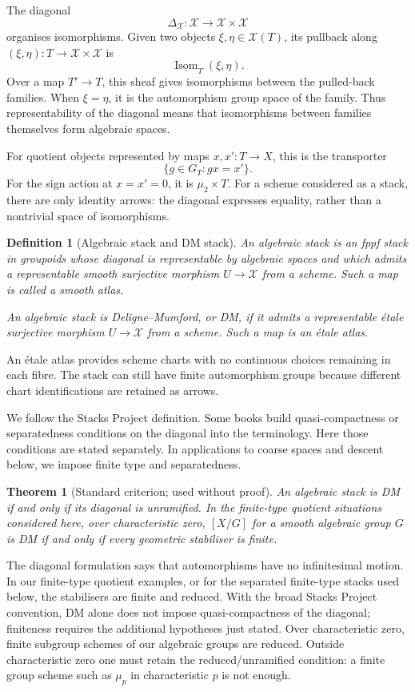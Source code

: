 \documentclass[11pt,a4paper]{article}
\numberwithin{equation}{section}
\newtheorem{theorem}[proposition]{Theorem}
\newtheorem{definition}[proposition]{Definition}
\theoremstyle{definition}
\newcommand{\cX}{\mathcal X}
\newcommand{\Isom}{\operatorname{Isom}}
\begin{document}
The diagonal
\[
 \Delta_{\cX}:\cX\longrightarrow\cX\times\cX
\]
organises isomorphisms. Given two objects $\xi,\eta\in\cX(T)$, its pullback
along $(\xi,\eta):T\to\cX\times\cX$ is
\[
 \underline{\Isom}_T(\xi,\eta).
\]
Over a map $T'\to T$, this sheaf gives isomorphisms between the pulled-back
families. When $\xi=\eta$, it is the automorphism group space of the family.
Thus representability of the diagonal means that isomorphisms between
families themselves form algebraic spaces.

For quotient objects represented by maps $x,x':T\to X$, this is the
transporter
\[
 \{g\in G_T:g x=x'\}.
\]
For the sign action at $x=x'=0$, it is $\mu_2\times T$. For a scheme
considered as a stack, there are only identity arrows: the diagonal expresses
equality, rather than a nontrivial space of isomorphisms.

\begin{definition}[Algebraic stack and DM stack]
An \emph{algebraic stack} is an fppf stack in groupoids whose diagonal is
representable by algebraic spaces and which admits a representable smooth
surjective morphism $U\to\cX$ from a scheme. Such a map is called a smooth atlas.

An algebraic stack is \emph{Deligne--Mumford}, or \emph{DM}, if it admits a
representable étale surjective morphism $U\to\cX$ from a scheme. Such a map
is an étale atlas.
\end{definition}

An étale atlas provides scheme charts with no continuous choices remaining
in each fibre. The stack can still have finite automorphism groups because
different chart identifications are retained as arrows.

We follow the Stacks Project definition. Some books build quasi-compactness
or separatedness conditions on the diagonal into the terminology. Here those
conditions are stated separately. In applications to coarse spaces and descent
below, we impose finite type and separatedness.

\begin{theorem}[Standard criterion; used without proof]\label{thm:dmcriterion}
An algebraic stack is DM if and only if its diagonal is unramified.
In the finite-type quotient situations considered here, over characteristic
zero, $[X/G]$ for a smooth algebraic group $G$ is DM if and only if every
geometric stabiliser is finite.
\end{theorem}

The diagonal formulation says that automorphisms have no infinitesimal motion.
In our finite-type quotient examples, or for the separated finite-type
stacks used below, the stabilisers are finite and reduced. With the broad
Stacks Project convention, DM alone does not impose quasi-compactness
of the diagonal; finiteness requires the additional hypotheses just stated. Over
characteristic zero, finite subgroup schemes of our algebraic groups are
reduced. Outside characteristic zero one must retain the reduced/unramified
condition: a finite group scheme such as $\mu_p$ in characteristic $p$ is
not enough.
\end{document}
